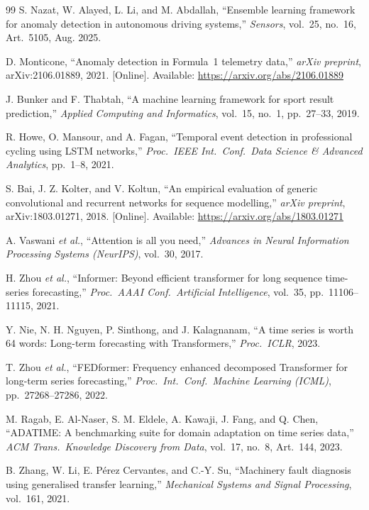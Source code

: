 \documentclass[conference,a4paper]{IEEEtran}
\begin{document}
\begin{thebibliography}{99}
S. Nazat, W. Alayed, L. Li, and M. Abdallah,
``Ensemble learning framework for anomaly detection in autonomous driving systems,''
\textit{Sensors}, vol.~25, no.~16, Art.~5105, Aug. 2025.

D. Monticone,
``Anomaly detection in Formula~1 telemetry data,''
\textit{arXiv preprint}, arXiv:2106.01889, 2021. [Online]. Available:
\url{https://arxiv.org/abs/2106.01889}

J. Bunker and F. Thabtah,
``A machine learning framework for sport result prediction,''
\textit{Applied Computing and Informatics}, vol.~15, no.~1, pp.~27--33, 2019.

R. Howe, O. Mansour, and A. Fagan,
``Temporal event detection in professional cycling using LSTM networks,''
\textit{Proc.\ IEEE Int.\ Conf.\ Data Science \& Advanced Analytics},
pp.~1--8, 2021.

S. Bai, J. Z. Kolter, and V. Koltun,
``An empirical evaluation of generic convolutional and recurrent networks for
sequence modelling,''
\textit{arXiv preprint}, arXiv:1803.01271, 2018. [Online]. Available:
\url{https://arxiv.org/abs/1803.01271}

A. Vaswani \textit{et al.},
``Attention is all you need,''
\textit{Advances in Neural Information Processing Systems (NeurIPS)}, vol.~30, 2017.

H. Zhou \textit{et al.},
``Informer: Beyond efficient transformer for long sequence time-series forecasting,''
\textit{Proc.\ AAAI Conf.\ Artificial Intelligence}, vol.~35, pp.~11106--11115, 2021.

Y. Nie, N. H. Nguyen, P. Sinthong, and J. Kalagnanam,
``A time series is worth 64 words: Long-term forecasting with Transformers,''
\textit{Proc.\ ICLR}, 2023.

T. Zhou \textit{et al.},
``FEDformer: Frequency enhanced decomposed Transformer for long-term series forecasting,''
\textit{Proc.\ Int.\ Conf.\ Machine Learning (ICML)}, pp.~27268--27286, 2022.

M. Ragab, E. Al-Naser, S. M. Eldele, A. Kawaji, J. Fang, and Q. Chen,
``ADATIME: A benchmarking suite for domain adaptation on time series data,''
\textit{ACM Trans.\ Knowledge Discovery from Data}, vol.~17, no.~8, Art.~144, 2023.

B. Zhang, W. Li, E. Pérez Cervantes, and C.-Y. Su,
``Machinery fault diagnosis using generalised transfer learning,''
\textit{Mechanical Systems and Signal Processing}, vol.~161, 2021.


\end{thebibliography}
\end{document}
